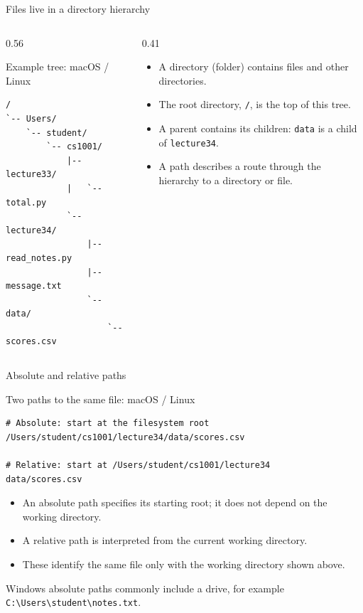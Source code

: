 \documentclass[aspectratio=169,10pt]{beamer}
\begin{document}
\begin{frame}[fragile]{Files live in a directory hierarchy}
\begin{columns}[T,onlytextwidth]
\begin{column}{0.56\textwidth}
\begin{block}{Example tree: macOS / Linux}
\begin{Verbatim}[fontsize=\scriptsize]
/
`-- Users/
    `-- student/
        `-- cs1001/
            |-- lecture33/
            |   `-- total.py
            `-- lecture34/
                |-- read_notes.py
                |-- message.txt
                `-- data/
                    `-- scores.csv
\end{Verbatim}
\end{block}
\end{column}
\begin{column}{0.41\textwidth}
\small\begin{itemize}
\item A directory (folder) contains files and other directories.
\item The root directory, \texttt{/}, is the top of this tree.
\item A parent contains its children: \texttt{data} is a child of \texttt{lecture34}.
\item A path describes a route through the hierarchy to a directory or file.
\end{itemize}
\end{column}
\end{columns}
\end{frame}

\begin{frame}[fragile]{Absolute and relative paths}
\begin{block}{Two paths to the same file: macOS / Linux}
\begin{Verbatim}[fontsize=\footnotesize]
# Absolute: start at the filesystem root
/Users/student/cs1001/lecture34/data/scores.csv

# Relative: start at /Users/student/cs1001/lecture34
data/scores.csv
\end{Verbatim}
\end{block}
\small\begin{itemize}
\item An absolute path specifies its starting root; it does not depend on the working directory.
\item A relative path is interpreted from the current working directory.
\item These identify the same file only with the working directory shown above.
\end{itemize}
{\scriptsize Windows absolute paths commonly include a drive, for example
\texttt{C:\textbackslash{}Users\textbackslash{}student\textbackslash{}notes.txt}.}
\end{frame}
\end{document}
